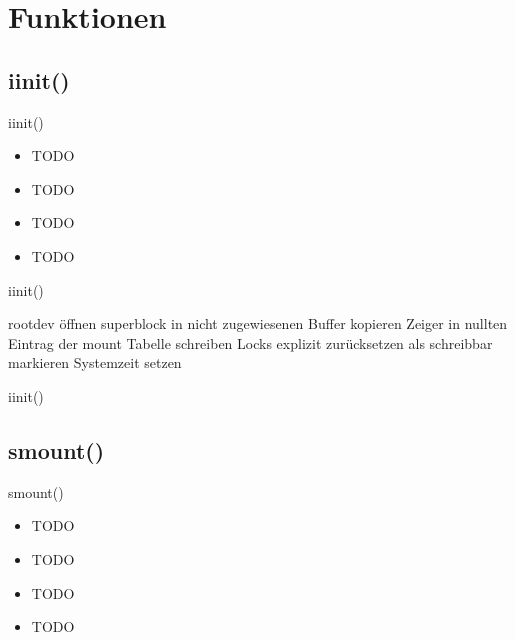 \documentclass{beamer}
\begin{document}
\section{Funktionen}

\begin{frame}[plain]
    \sectionpage
\end{frame}




\subsection{iinit()}

\begin{frame}{iinit()}
    \begin{itemize}
        \item TODO
        \item TODO
        \item TODO
        \item TODO
    \end{itemize}
\end{frame}

\begin{frame}{iinit()}
    \begin{algorithmic}[1]
        \State rootdev öffnen
        \State superblock in nicht zugewiesenen Buffer kopieren
        \State Zeiger in nullten Eintrag der mount Tabelle schreiben
        \State Locks explizit zurücksetzen
        \State als schreibbar markieren
        \State Systemzeit setzen
    \end{algorithmic}
\end{frame}

\begin{frame}{iinit()}
\end{frame}




\subsection{smount()}

\begin{frame}{smount()}
    \begin{itemize}
        \item TODO
        \item TODO
        \item TODO
        \item TODO
    \end{itemize}
\end{frame}
\end{document}
